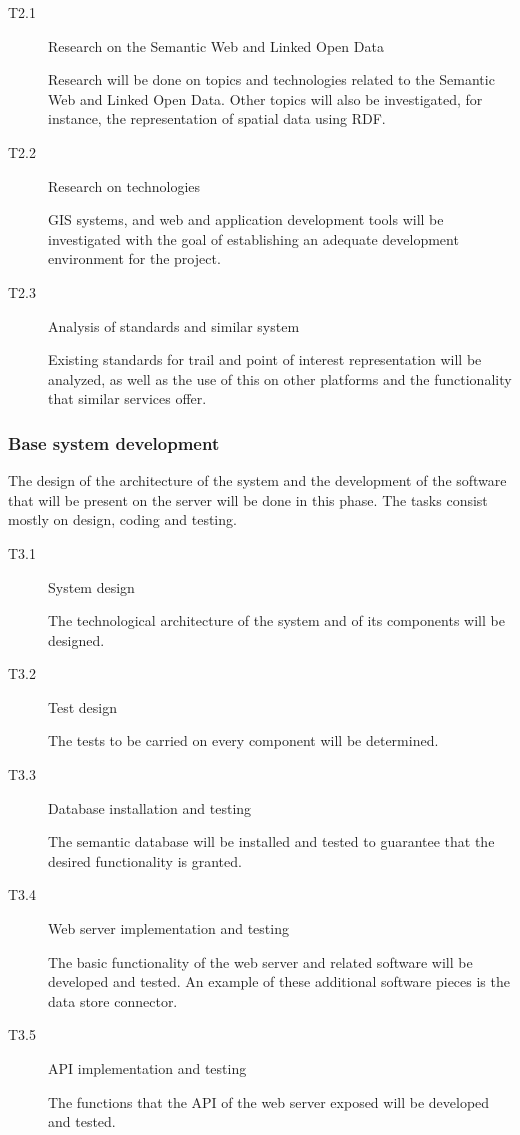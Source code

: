 \begin{description}
\item[T2.1] Research on the Semantic Web and Linked Open Data

Research will be done on topics and technologies related to the Semantic Web and Linked Open Data. Other topics will also be investigated, for instance, the representation of spatial data using RDF.

\item[T2.2] Research on technologies

GIS systems, and web and application development tools will be investigated with the goal of establishing an adequate development environment for the project.

\item[T2.3] Analysis of standards and similar system

Existing standards for trail and point of interest representation will be analyzed, as well as the use of this on other platforms and the functionality that similar services offer.

\end{description}

\subsubsection*{Base system development}

The design of the architecture of the system and the development of the software that will be present on the server will be done in this phase. The tasks consist mostly on design, coding and testing.

\begin{description}
\item[T3.1] System design

The technological architecture of the system and of its components will be designed.

\item[T3.2] Test design

The tests to be carried on every component will be determined.

\item[T3.3] Database installation and testing

The semantic database will be installed and tested to guarantee that the desired functionality is granted.

\item[T3.4] Web server implementation and testing

The basic functionality of the web server and related software will be developed and tested. An example of these additional software pieces is the data store connector.

\item[T3.5] API implementation and testing

The functions that the API of the web server exposed will be developed and tested.

\end{description}

